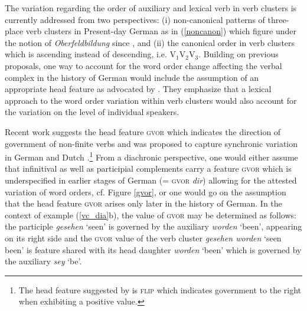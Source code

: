 \documentclass[output=paper
                ,modfonts
                ,nonflat
	        ,collection
	        ,collectionchapter
	        ,collectiontoclongg
 	        ,biblatex
                ,babelshorthands
                ,newtxmath
                ,draftmode
                ,colorlinks, citecolor=brown
]{./langsci/langscibook}
\begin{document}
The variation regarding the order of auxiliary and lexical verb in verb clusters is currently addressed from two perspectives: (i) non-canonical patterns of three-place verb clusters in Present-day German as in (\ref{noncanon}) which figure under the notion of \textit{Oberfeldbildung} since \cite{bech1983}, and (ii) the canonical order in  verb clusters which is ascending instead of descending, i.e. V$_1$V$_2$V$_3$. Building on previous proposals, one way to account for the word order change affecting the verbal complex in the history of German would include the assumption of an appropriate head feature as advocated by \cite{HiNa94}. They emphasize that a lexical approach to the word order variation within verb clusters would also account for the variation on the level of individual speakers.

Recent work suggests the head feature \textsc{gvor} which indicates the direction of government of non-finite verbs and was proposed to capture synchronic variation in German and Dutch \citep{BoNo1996,kathol2000,augustinus2015}.\footnote{The head feature suggested by \cite{HiNa94} is \textsc{flip} which indicates government to the right when exhibiting a positive value.} From a diachronic perspective, one would either assume that infinitival as well as participial complements carry a feature \textsc{gvor} which is underspecified in earlier stages of German (= \textsc{gvor} \textit{dir}) allowing for the attested variation of word orders, cf. Figure \ref{gvor}, or one would go on the assumption that the head feature \textsc{gvor} arises only later in the history of German. In the context of example (\ref{vc_dia}b), the value of \textsc{gvor} may be determined as follows: the participle \textit{gesehen} `seen' is governed by the auxiliary \textit{worden} `been', appearing on its right side and the \textsc{gvor} value of the verb cluster \textit{gesehen worden} `seen been' is feature shared with its head daughter \textit{worden} `been' which is governed by the auxiliary \textit{sey} `be'.  
\end{document}
